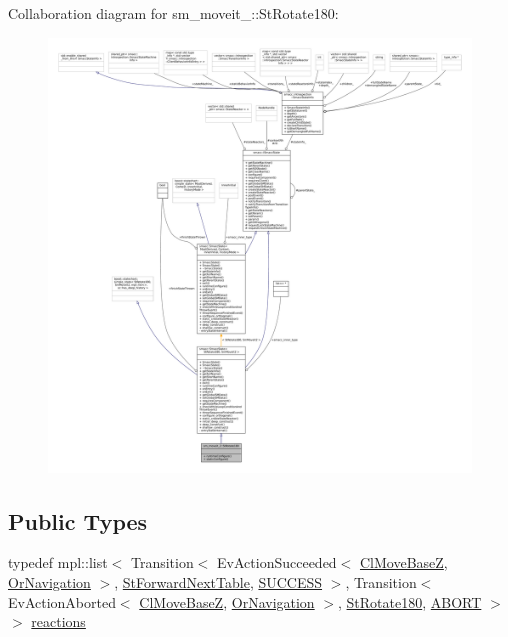 Collaboration diagram for sm\+\_\+moveit\+\_\+:\+:St\+Rotate180\+:
\nopagebreak
\begin{figure}[H]
\begin{center}
\leavevmode
\includegraphics[width=350pt]{structsm__moveit__2_1_1StRotate180__coll__graph}
\end{center}
\end{figure}
\subsection*{Public Types}
\begin{DoxyCompactItemize}
\item 
typedef mpl\+::list$<$ Transition$<$ Ev\+Action\+Succeeded$<$ \hyperlink{classcl__move__base__z_1_1ClMoveBaseZ}{Cl\+Move\+BaseZ}, \hyperlink{classsm__moveit__2_1_1OrNavigation}{Or\+Navigation} $>$, \hyperlink{structsm__moveit__2_1_1StForwardNextTable}{St\+Forward\+Next\+Table}, \hyperlink{classSUCCESS}{S\+U\+C\+C\+E\+SS} $>$, Transition$<$ Ev\+Action\+Aborted$<$ \hyperlink{classcl__move__base__z_1_1ClMoveBaseZ}{Cl\+Move\+BaseZ}, \hyperlink{classsm__moveit__2_1_1OrNavigation}{Or\+Navigation} $>$, \hyperlink{structsm__moveit__2_1_1StRotate180}{St\+Rotate180}, \hyperlink{classABORT}{A\+B\+O\+RT} $>$ $>$ \hyperlink{structsm__moveit__2_1_1StRotate180_ac1a99ab8b546643d3cdc429fba88390a}{reactions}
\end{DoxyCompactItemize}
